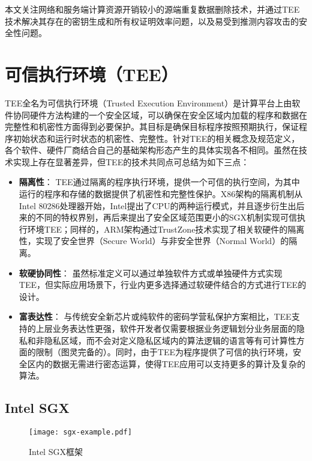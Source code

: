 本文关注网络和服务端计算资源开销较小的源端重复数据删除技术，并通过TEE技术解决其存在的密钥生成和所有权证明效率问题，以及易受到推测内容攻击的安全性问题。

\section{可信执行环境（TEE）}
\label{sec:background-tee}

TEE全名为可信执行环境（Trusted Execution Environment）是计算平台上由软件协同硬件方法构建的一个安全区域，可以确保在安全区域内加载的程序和数据在完整性和机密性方面得到必要保护。其目标是确保目标程序按照预期执行，保证程序初始状态和运行时状态的机密性、完整性。针对TEE的相关概念及规范定义，各个软件、硬件厂商结合自己的基础架构形态产生的具体实现各不相同。虽然在技术实现上存在显著差异，但TEE的技术共同点可总结为如下三点：

\begin{itemize}[leftmargin=*]
    \item \textbf{隔离性}：
    TEE通过隔离的程序执行环境，提供一个可信的执行空间，为其中运行的程序和存储的数据提供了机密性和完整性保护。X86架构的隔离机制从Intel 80286处理器开始，Intel提出了CPU的两种运行模式，并且逐步衍生出后来的不同的特权界别，再后来提出了安全区域范围更小的SGX机制实现可信执行环境TEE；同样的，ARM架构通过TrustZone技术实现了相关软硬件的隔离性，实现了安全世界（Secure World）与非安全世界（Normal World）的隔离。
    \item \textbf{软硬协同性}：
    虽然标准定义可以通过单独软件方式或单独硬件方式实现TEE，但实际应用场景下，行业内更多选择通过软硬件结合的方式进行TEE的设计。
    \item \textbf{富表达性}：
    与传统安全新芯片或纯软件的密码学营私保护方案相比，TEE支持的上层业务表达性更强，软件开发者仅需要根据业务逻辑划分业务层面的隐私和非隐私区域，而不会对定义隐私区域内的算法逻辑的语言等有可计算性方面的限制（图灵完备的）。同时，由于TEE为程序提供了可信的执行环境，安全区内的数据无需进行密态运算，使得TEE应用可以支持更多的算计及复杂的算法。
\end{itemize}

\subsection{Intel SGX}
\label{subsec:background-tee-sgx}

\begin{figure}[!htb]
    \small
    \centering
    \texttt{[image: sgx-example.pdf]}
    \caption{Intel SGX框架} 
    \label{fig:sgx-arch}
\end{figure}

